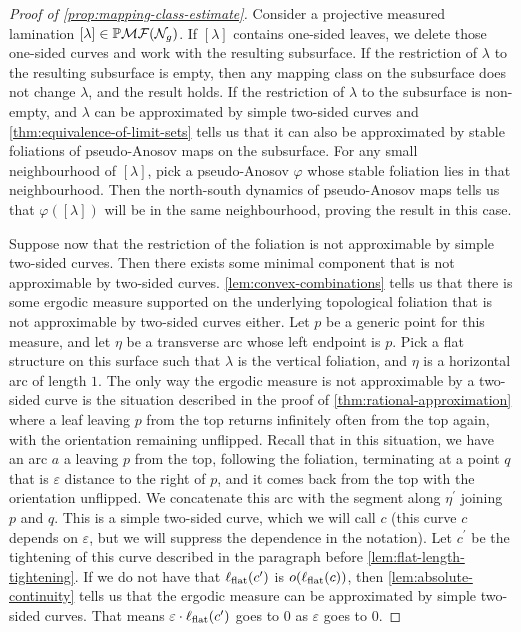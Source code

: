 \documentclass[12pt, reqno]{amsart}
\begin{document}
\begin{proof}[Proof of \autoref{prop:mapping-class-estimate}]
  Consider a projective measured lamination $[\lambda] \in \mathbb{P}\mathcal{MF}(\mathcal{N}_g)$.
  If $[\lambda]$ contains one-sided leaves, we delete those one-sided curves and work with the resulting subsurface.
  If the restriction of $\lambda$ to the resulting subsurface is empty, then any mapping class on the subsurface does not change $\lambda$, and the result holds.
  If the restriction of $\lambda$ to the subsurface is non-empty, and $\lambda$ can be approximated by simple two-sided curves and \autoref{thm:equivalence-of-limit-sets} tells us that it can also be approximated by stable foliations of pseudo-Anosov maps on the subsurface.
  For any small neighbourhood of $[\lambda]$, pick a pseudo-Anosov $\varphi$ whose stable foliation lies in that neighbourhood.
  Then the north-south dynamics of pseudo-Anosov maps tells us that $\varphi([\lambda])$ will be in the same neighbourhood, proving the result in this case.

  Suppose now that the restriction of the foliation is not approximable by simple two-sided curves.
  Then there exists some minimal component that is not approximable by two-sided curves.
  \autoref{lem:convex-combinations} tells us that there is some ergodic measure supported on the underlying topological foliation that is not approximable by two-sided curves either.
  Let $p$ be a generic point for this measure, and let $\eta$ be a transverse arc whose left endpoint is $p$.
  Pick a flat structure on this surface such that $\lambda$ is the vertical foliation, and $\eta$ is a horizontal arc of length $1$.
  The only way the ergodic measure is not approximable by a two-sided curve is the situation described in the proof of \autoref{thm:rational-approximation} where a leaf leaving $p$ from the top returns infinitely often from the top again, with the orientation remaining unflipped.
  Recall that in this situation, we have an arc $a$ a leaving $p$ from the top, following the foliation, terminating at a point $q$ that is $\varepsilon$ distance to the right of $p$, and it comes back from the top with the orientation unflipped.
  We concatenate this arc with the segment along $\eta^{\prime}$ joining $p$ and $q$.
  This is a simple two-sided curve, which we will call $c$ (this curve $c$ depends on $\varepsilon$, but we will suppress the dependence in the notation).
  Let $c^{\prime}$ be the tightening of this curve described in the paragraph before \autoref{lem:flat-length-tightening}.
  If we do not have that $\ell_{\mathrm{flat}}(c^{\prime})$ is $o(\ell_{\mathrm{flat}}(c))$, then \autoref{lem:absolute-continuity} tells us that the ergodic measure can be approximated by simple two-sided curves.
  That means $\varepsilon \cdot \ell_{\mathrm{flat}}(c^{\prime})$ goes to $0$ as $\varepsilon$ goes to $0$.


\end{proof}
\end{document}
